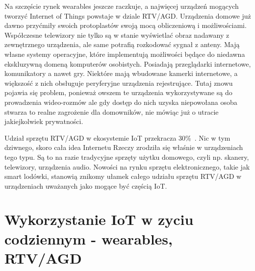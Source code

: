 \documentclass[brudnopis]{xmgr}
\begin{document}
Na szczęście rynek wearables jeszcze raczkuje, a najwięcej urządzeń mogących tworzyć Internet of Things powstaje w dziale RTV/AGD. Urządzenia domowe już dawno przyćmiły swoich protoplastów swoją mocą obliczeniową i możliwościami. Współczesne telewizory nie tylko są w stanie wyświetlać obraz nadawany z zewnętrznego urządzenia, ale same potrafią rozkodować sygnał z anteny. Mają własne systemy operacyjne, które implementują możliwości będące do niedawna ekskluzywną domeną komputerów osobistych. Posiadają przeglądarki internetowe, komunikatory a nawet gry. Niektóre mają wbudowane kamerki internetowe, a większość z nich obsługuje peryferyjne urządzenia rejestrujące. Tutaj znowu pojawia się problem, ponieważ owszem te urządzenia wykorzystywane są do prowadzenia wideo-rozmów ale gdy dostęp do nich uzyska niepowołana osoba stwarza to realne zagrożenie dla domowników, nie mówiąc już o utracie jakiejkolwiek prywatności.

Udział sprzętu RTV/AGD w ekosystemie IoT przekracza 30\%~\cite{IotWPolsce:2015:CMC}. Nic w tym dziwnego, skoro cała idea Internetu Rzeczy zrodziła się właśnie w urządzeniach tego typu. Są to na razie tradycyjne sprzęty użytku domowego, czyli np. skanery, telewizory, urządzenia audio. Nowości na rynku sprzętu elektronicznego, takie jak smart lodówki, stanowią znikomy ułamek całego udziału sprzętu RTV/AGD w urządzeniach uważanych jako mogące być częścią IoT.

\section{Wykorzystanie IoT w zyciu codziennym - wearables, RTV/AGD}
\end{document}
